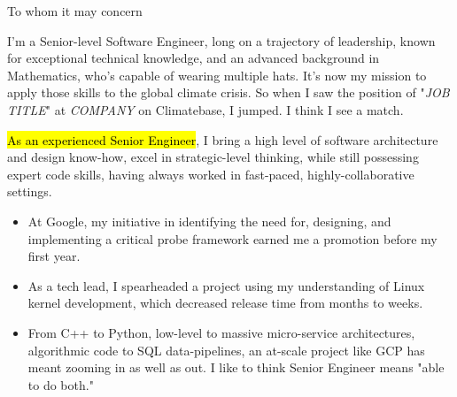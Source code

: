 \documentclass{tc_cv}
\begin{document}

\begin{adjustwidth}{40pt}{40pt}

  To whom it may concern\par \bigskip

  I'm a Senior-level Software Engineer, long on a trajectory of leadership,
  known for exceptional technical knowledge, and an advanced background in
  Mathematics, who's capable of wearing multiple hats.
  It's now my mission to apply those skills to the global climate crisis. So
  when I saw the position of "\emph{JOB TITLE}" at \emph{COMPANY} on
  Climatebase, I jumped. I think I see a match. \medskip


  \hl{As an experienced Senior Engineer}, I bring a high level of software
  architecture and design know-how, excel in strategic-level thinking, while
  still possessing expert code skills, having always worked in fast-paced,
  highly-collaborative settings.
  \begin{itemize}
    \item At Google, my initiative in identifying the need for, designing, and
      implementing a critical probe framework earned me a promotion before my
      first year.
    \item As a tech lead, I spearheaded a project using my understanding of
      Linux kernel development, which decreased release time from months to
      weeks.
    \item From C++ to Python, low-level to massive micro-service architectures,
      algorithmic code to SQL data-pipelines, an at-scale project like GCP has
      meant zooming in as well as out. I like to think Senior Engineer means
      "able to do both."
  \end{itemize} \medskip


\end{adjustwidth}
\end{document}
